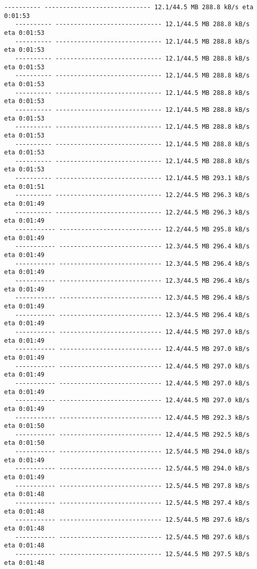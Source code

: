 \documentclass[11pt]{article}
\begin{document}
\begin{Verbatim}[commandchars=\\\{\}]
   ---------- ----------------------------- 12.1/44.5 MB 288.8 kB/s eta 0:01:53
   ---------- ----------------------------- 12.1/44.5 MB 288.8 kB/s eta 0:01:53
   ---------- ----------------------------- 12.1/44.5 MB 288.8 kB/s eta 0:01:53
   ---------- ----------------------------- 12.1/44.5 MB 288.8 kB/s eta 0:01:53
   ---------- ----------------------------- 12.1/44.5 MB 288.8 kB/s eta 0:01:53
   ---------- ----------------------------- 12.1/44.5 MB 288.8 kB/s eta 0:01:53
   ---------- ----------------------------- 12.1/44.5 MB 288.8 kB/s eta 0:01:53
   ---------- ----------------------------- 12.1/44.5 MB 288.8 kB/s eta 0:01:53
   ---------- ----------------------------- 12.1/44.5 MB 288.8 kB/s eta 0:01:53
   ---------- ----------------------------- 12.1/44.5 MB 288.8 kB/s eta 0:01:53
   ---------- ----------------------------- 12.1/44.5 MB 293.1 kB/s eta 0:01:51
   ---------- ----------------------------- 12.2/44.5 MB 296.3 kB/s eta 0:01:49
   ---------- ----------------------------- 12.2/44.5 MB 296.3 kB/s eta 0:01:49
   ----------- ---------------------------- 12.2/44.5 MB 295.8 kB/s eta 0:01:49
   ----------- ---------------------------- 12.3/44.5 MB 296.4 kB/s eta 0:01:49
   ----------- ---------------------------- 12.3/44.5 MB 296.4 kB/s eta 0:01:49
   ----------- ---------------------------- 12.3/44.5 MB 296.4 kB/s eta 0:01:49
   ----------- ---------------------------- 12.3/44.5 MB 296.4 kB/s eta 0:01:49
   ----------- ---------------------------- 12.3/44.5 MB 296.4 kB/s eta 0:01:49
   ----------- ---------------------------- 12.4/44.5 MB 297.0 kB/s eta 0:01:49
   ----------- ---------------------------- 12.4/44.5 MB 297.0 kB/s eta 0:01:49
   ----------- ---------------------------- 12.4/44.5 MB 297.0 kB/s eta 0:01:49
   ----------- ---------------------------- 12.4/44.5 MB 297.0 kB/s eta 0:01:49
   ----------- ---------------------------- 12.4/44.5 MB 297.0 kB/s eta 0:01:49
   ----------- ---------------------------- 12.4/44.5 MB 292.3 kB/s eta 0:01:50
   ----------- ---------------------------- 12.4/44.5 MB 292.5 kB/s eta 0:01:50
   ----------- ---------------------------- 12.5/44.5 MB 294.0 kB/s eta 0:01:49
   ----------- ---------------------------- 12.5/44.5 MB 294.0 kB/s eta 0:01:49
   ----------- ---------------------------- 12.5/44.5 MB 297.8 kB/s eta 0:01:48
   ----------- ---------------------------- 12.5/44.5 MB 297.4 kB/s eta 0:01:48
   ----------- ---------------------------- 12.5/44.5 MB 297.6 kB/s eta 0:01:48
   ----------- ---------------------------- 12.5/44.5 MB 297.6 kB/s eta 0:01:48
   ----------- ---------------------------- 12.5/44.5 MB 297.5 kB/s eta 0:01:48

\end{Verbatim}
\end{document}
